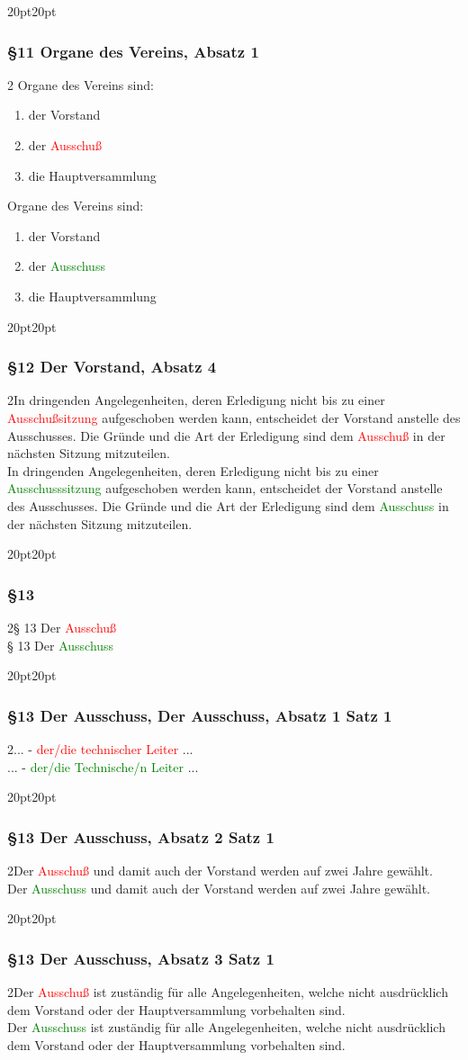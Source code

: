 \documentclass[10pt,a4paper,parskip=half]{scrartcl}
\newcommand{\new}[1]{\textcolor{Green}{#1}}
\newcommand{\old}[1]{\textcolor{Red}{#1}}
\newcommand{\change}[1]{
  \begin{adjustwidth}{20pt}{20pt}
    #1
  \end{adjustwidth}
}
\newcommand{\compare}[3]{\change{\subsubsection*{#1}\begin{multicols}{2}#2\columnbreak\\#3\end{multicols}}}
\begin{document}
\change{
  \subsubsection*{§11 Organe des Vereins, Absatz 1}\begin{multicols}{2}
    Organe des Vereins sind:
    \begin{enumerate}[noitemsep]
      \item der Vorstand
      \item der \old{Ausschuß}
      \item die Hauptversammlung
    \end{enumerate}
    \columnbreak
    Organe des Vereins sind:
    \begin{enumerate}[noitemsep]
      \item der Vorstand
      \item der \new{Ausschuss}
      \item die Hauptversammlung
    \end{enumerate}
  \end{multicols}
}

\clearpage
\compare{§12 Der Vorstand, Absatz 4}
{In dringenden Angelegenheiten,
  deren Erledigung nicht bis zu einer \old{Ausschußsitzung} aufgeschoben werden kann,
  entscheidet der Vorstand anstelle des Ausschusses.
  Die Gründe und die Art der Erledigung sind dem \old{Ausschuß} in der nächsten Sitzung mitzuteilen.
}{
  In dringenden Angelegenheiten,
  deren Erledigung nicht bis zu einer \new{Ausschusssitzung} aufgeschoben werden kann,
  entscheidet der Vorstand anstelle des Ausschusses.
  Die Gründe und die Art der Erledigung sind dem \new{Ausschuss} in der nächsten Sitzung mitzuteilen.
}

\compare{§13}
{§ 13 Der \old{Ausschuß}}
{§ 13 Der \new{Ausschuss}}

\compare{§13 Der Ausschuss, Der Ausschuss, Absatz 1 Satz 1}
{... - \old{der/die technischer Leiter} ...}{... - \new{der/die Technische/n Leiter} ...}


\compare{§13 Der Ausschuss, Absatz 2 Satz 1}
{Der \old{Ausschuß} und damit auch der Vorstand werden auf zwei Jahre gewählt.}
{Der \new{Ausschuss} und damit auch der Vorstand werden auf zwei Jahre gewählt.}

\compare{§13 Der Ausschuss, Absatz 3 Satz 1}
{Der \old{Ausschuß} ist zuständig für alle Angelegenheiten, welche nicht ausdrücklich dem Vorstand oder der Hauptversammlung vorbehalten sind.}
{Der \new{Ausschuss} ist zuständig für alle Angelegenheiten, welche nicht ausdrücklich dem Vorstand oder der Hauptversammlung vorbehalten sind.}
\end{document}
